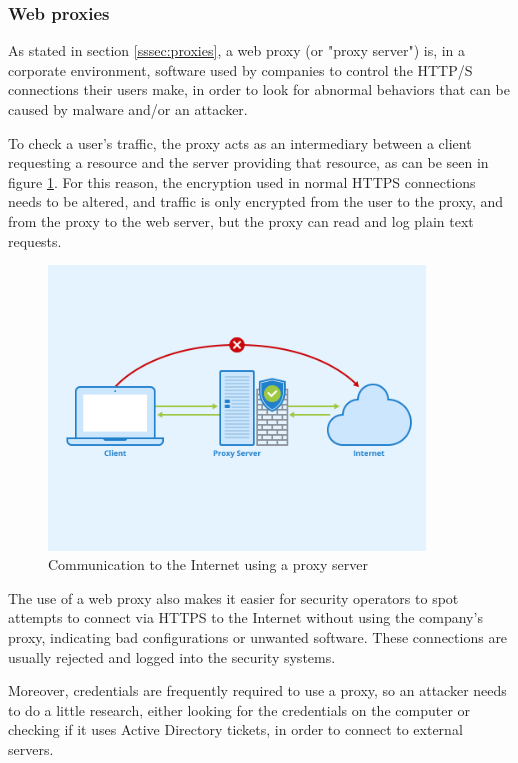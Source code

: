 \subsubsection{Web proxies}
\label{sssec:researchDiscProxy}
As stated in section \ref{sssec:proxies}, a web proxy (or "proxy server") is, in a corporate environment, software used by companies to control the HTTP/S connections their users make, in order to look for abnormal behaviors that can be caused by malware and/or an attacker. 

To check a user's traffic, the proxy acts as an intermediary between a client requesting a resource and the server providing that resource, as can be seen in figure \ref{img:proxyServer}. For this reason, the encryption used in normal HTTPS connections needs to be altered, and traffic is only encrypted from the user to the proxy, and from the proxy to the web server, but the proxy can read and log plain text requests. 

\begin{figure}[!ht]
	\centering
	\includegraphics[width=10cm,trim={0 2cm 0 2cm},clip]{img/Proxy-Server}
	\caption{Communication to the Internet using a proxy server}
	\label{img:proxyServer}
\end{figure}

\pagebreak
The use of a web proxy also makes it easier for security operators to spot attempts to connect via HTTPS to the Internet without using the company's proxy, indicating bad configurations or unwanted software. These connections are usually rejected and logged into the security systems.

Moreover, credentials are frequently required to use a proxy, so an attacker needs to do a little research, either looking for the credentials on the computer or checking if it uses Active Directory tickets, in order to connect to external servers.

